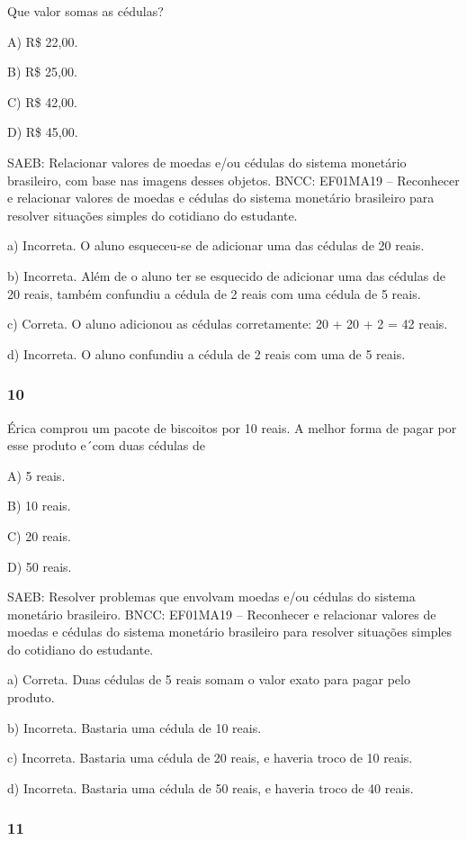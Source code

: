 Que valor somas as cédulas?

A) R\$ 22,00.

B) R\$ 25,00.

C) R\$ 42,00.

D) R\$ 45,00.

SAEB: Relacionar valores de moedas e/ou cédulas do sistema
monetário brasileiro, com base nas imagens desses objetos.
BNCC: EF01MA19 -- Reconhecer e relacionar valores de moedas e cédulas do
sistema monetário brasileiro para resolver situações simples do
cotidiano do estudante.

a) Incorreta. O aluno esqueceu-se de adicionar uma das cédulas de 20
reais.

b) Incorreta. Além de o aluno ter se esquecido de adicionar uma das
cédulas de 20 reais, também confundiu a cédula de 2 reais com
uma cédula de 5 reais.

c) Correta. O aluno adicionou as cédulas corretamente: 20 + 20 + 2 = 42
reais.

d) Incorreta. O aluno confundiu a cédula de 2 reais com uma de 5
reais.

\subsubsection{10}\label{section-96}

Érica comprou um pacote de biscoitos por 10 reais. A melhor
forma de pagar por esse produto e´com duas cédulas de

A) 5 reais.

B) 10 reais.

C) 20 reais.

D) 50 reais.

SAEB: Resolver problemas que envolvam moedas e/ou cédulas do
sistema monetário brasileiro.
BNCC: EF01MA19 -- Reconhecer e relacionar valores de moedas e cédulas do
sistema monetário brasileiro para resolver situações simples do
cotidiano do estudante.

a) Correta. Duas cédulas de 5 reais somam o valor exato para pagar pelo produto.

b) Incorreta. Bastaria uma cédula de 10 reais.

c) Incorreta. Bastaria uma cédula de 20 reais, e haveria troco de 10 reais.

d) Incorreta. Bastaria uma cédula de 50 reais, e haveria troco de 40 reais.

\subsubsection{11}\label{section-97}

